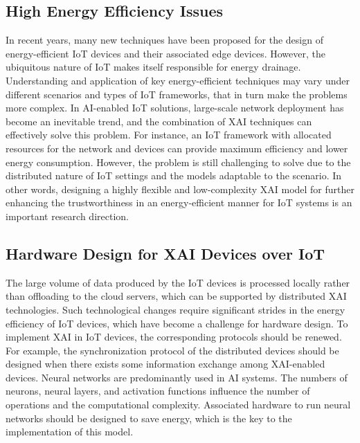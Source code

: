 \documentclass[journal]{IEEEtran}
\begin{document}
\subsection{High Energy Efficiency Issues}
In recent years, many new techniques have been proposed for the design of energy-efficient IoT devices and their associated edge devices. However, the ubiquitous nature of IoT makes itself responsible for energy drainage. Understanding and application of key energy-efficient techniques may vary under different scenarios and types of IoT frameworks, that in turn make the problems more complex. In AI-enabled IoT solutions, large-scale network deployment has become an inevitable trend, and the combination of XAI techniques can effectively solve this problem. For instance, an IoT framework with allocated resources for the network and devices can provide maximum efficiency and lower energy consumption. However, the problem is still challenging to solve due to the distributed nature of IoT settings and the models adaptable to the scenario. In other words, designing a highly flexible and low-complexity XAI model for further enhancing the trustworthiness in an energy-efficient manner for IoT systems is an important research direction.

\subsection{Hardware Design for XAI Devices over IoT}
The large volume of data produced by the IoT devices is processed locally rather than offloading to the cloud servers, which can be supported by distributed XAI technologies. Such technological changes require significant strides in the energy efficiency of IoT devices, which have become a challenge for hardware design. To implement XAI in IoT devices, the corresponding protocols should be renewed. For example, the synchronization protocol of the distributed devices should be designed when there exists some information exchange among XAI-enabled devices. Neural networks are predominantly used in AI systems. The numbers of neurons, neural layers, and activation functions influence the number of operations and the computational complexity. Associated hardware to run neural networks should be designed to save energy, which is the key to the implementation of this model.   
\end{document}
